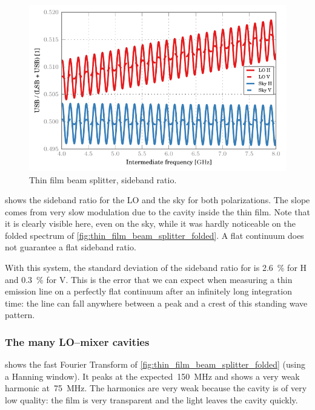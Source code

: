 \begin{figure}[hbtp]
    \centering
    \includegraphics{thin_film_beam_splitter_sbr}
    \caption{Thin film beam splitter, sideband ratio.}
    \label{fig:thin_film_beam_splitter_sbr}
\end{figure}
 shows the sideband ratio for the LO and the sky for both polarizations.
The slope comes from very slow modulation due to the cavity inside the thin film.
Note that it is clearly visible here, even on the sky, while it was hardly noticeable on the folded spectrum of \cref{fig:thin_film_beam_splitter_folded}.
A flat continuum does not guarantee a flat sideband ratio.

With this system, the standard deviation of the sideband ratio for is \SI{2.6}{\percent} for H and \SI{0.3}{\percent} for V.
This is the error that we can expect when measuring a thin emission line on a perfectly flat continuum after an infinitely long integration time: the line can fall anywhere between a peak and a crest of this standing wave pattern.

\subsubsection{The many LO--mixer cavities}

 shows
the fast Fourier Transform of \cref{fig:thin_film_beam_splitter_folded} (using a Hanning window).
It peaks at the expected~\SI{150}{\mega\hertz} and shows a very weak harmonic at~\SI{75}{\mega\hertz}.
The harmonics are very weak because the cavity is of very low quality: the film is very transparent and the light leaves the cavity quickly.

